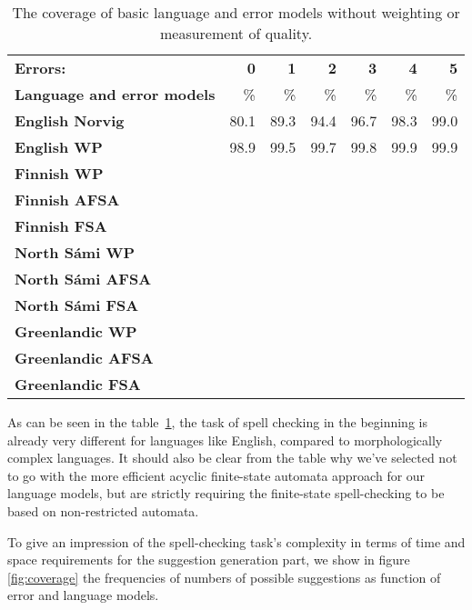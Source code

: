 \documentclass[a4paper,12pt]{article}
\begin{document}
\begin{table}
    \centering
    \begin{tabular}{|l|r|r|r||r|r|r|}
        \hline
        \bf Errors: & \bf 0  & \bf 1 & \bf 2 & \bf 3 & \bf 4 & \bf 5 \\
        \bf Language and error models &  \% & \% & \% & \% & \% & \% \\
        \hline
        \bf English Norvig & 80.1 & 89.3 & 94.4 & 96.7 & 98.3 & 99.0 \\
            \bf English WP & 98.9 & 99.5 & 99.7 & 99.8 & 99.9 & 99.9 \\
        \hline
                   \bf Finnish WP & & & & & & \\
                  \bf Finnish AFSA & & & & & & \\
                  \bf Finnish FSA & & & & & & \\
        \hline
        \bf North Sámi WP & & & & & & \\
               \bf North Sámi AFSA & & & & & & \\
               \bf North Sámi FSA & & & & & & \\
        \hline
        \bf Greenlandic WP & & & & & & \\
                 \bf Greenlandic AFSA & & & & & & \\
                  \bf Greenlandic FSA & & & & & & \\
        \hline
    \end{tabular}
    \caption{The coverage of basic language and error models without weighting
        or measurement of quality.\label{table:baseline-coverage}}
\end{table}

As can be seen in the table~\ref{table:baseline-coverage}, the task of spell
checking in the beginning is already very different for languages like English,
compared to morphologically complex languages. It should also be
clear from the table why we've selected not to go with the more efficient
acyclic finite-state automata approach for our language models, but are
strictly requiring the finite-state spell-checking to be based on
non-restricted automata.

To give an impression of the spell-checking task's complexity in terms of time
and space requirements for the suggestion generation part, we show in figure
\ref{fig:coverage} the frequencies of numbers of possible suggestions as
function of error and language models.
\end{document}

